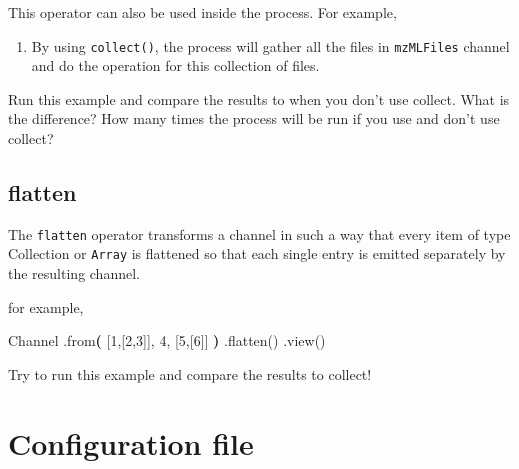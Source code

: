 \documentclass[
]{book}
\newenvironment{Shaded}{\begin{snugshade}}{\end{snugshade}}
\newcommand{\CommentTok}[1]{\textcolor[rgb]{0.56,0.35,0.01}{\textit{#1}}}
\newcommand{\ErrorTok}[1]{\textcolor[rgb]{0.64,0.00,0.00}{\textbf{#1}}}
\newcommand{\ExtensionTok}[1]{#1}
\newcommand{\FunctionTok}[1]{\textcolor[rgb]{0.00,0.00,0.00}{#1}}
\newcommand{\KeywordTok}[1]{\textcolor[rgb]{0.13,0.29,0.53}{\textbf{#1}}}
\newcommand{\NormalTok}[1]{#1}
\newcommand{\StringTok}[1]{\textcolor[rgb]{0.31,0.60,0.02}{#1}}
\newcommand{\VariableTok}[1]{\textcolor[rgb]{0.00,0.00,0.00}{#1}}
\providecommand{\tightlist}{%
  \setlength{\itemsep}{0pt}\setlength{\parskip}{0pt}}
\begin{document}
This operator can also be used inside the process. For example,

\begin{Shaded}
\end{Shaded}

\begin{enumerate}
\def\labelenumi{\arabic{enumi}.}
\tightlist
\item
  By using \texttt{collect()}, the process will gather all the files in \texttt{mzMLFiles} channel and do the operation for this collection of files.
\end{enumerate}

Run this example and compare the results to when you don't use collect. What is the difference? How many times the process will be run if you use and don't use collect?

\hypertarget{flatten}{%
\section{flatten}\label{flatten}}

The \texttt{flatten} operator transforms a channel in such a way that every item of type Collection or \texttt{Array} is flattened so that each single entry is emitted separately by the resulting channel.

for example,

\begin{Shaded}
\begin{Highlighting}[numbers=left,,]
\ExtensionTok{Channel}
    \ExtensionTok{.from}\ErrorTok{(} \ExtensionTok{[1,[2,3]],}\NormalTok{ 4, [5,[6]] }\KeywordTok{)}
    \FunctionTok{.flatten()}
    \FunctionTok{.view()}
\end{Highlighting}
\end{Shaded}

Try to run this example and compare the results to collect!

\hypertarget{configuration-file}{%
\chapter{Configuration file}\label{configuration-file}}
\end{document}
